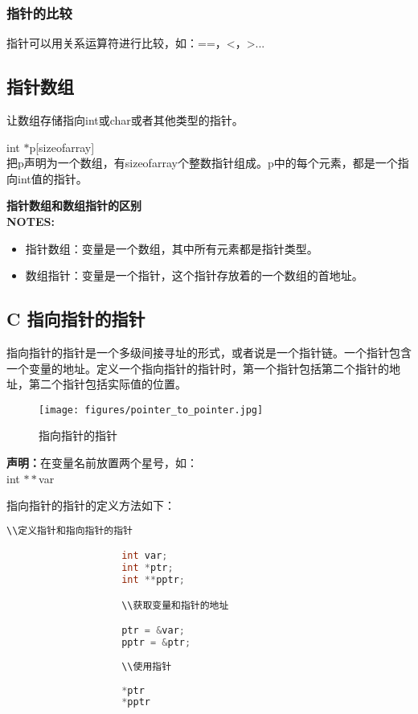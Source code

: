 \documentclass[UTF8]{ctexart}
\begin{document}
			\subsubsection{指针的比较}
			指针可以用关系运算符进行比较，如：==，<，>...
			\subsection{指针数组}
			让数组存储指向int或char或者其他类型的指针。\begin{framed}
				int $*$p[sizeofarray]\\
				把p声明为一个数组，有sizeofarray个整数指针组成。p中的每个元素，都是一个指向int值的指针。
			\end{framed}
			\begin{framed}
				\textbf{指针数组和数组指针的区别}\\ \textbf{NOTES:}
				\begin{itemize}
					\item 指针数组：变量是一个数组，其中所有元素都是指针类型。
					\item 数组指针：变量是一个指针，这个指针存放着的一个数组的首地址。
				\end{itemize}
			\end{framed}
			\subsection{C 指向指针的指针}
			指向指针的指针是一个多级间接寻址的形式，或者说是一个指针链。一个指针包含一个变量的地址。定义一个指向指针的指针时，第一个指针包括第二个指针的地址，第二个指针包括实际值的位置。
			\begin{figure}
				\centering
				\texttt{[image: figures/pointer\_to\_pointer.jpg]}
				\caption{指向指针的指针}
			\end{figure}
			\begin{framed}
				\textbf{声明：}在变量名前放置两个星号，如：\\
				int $**$var
			\end{framed}
			指向指针的指针的定义方法如下：
				\begin{lstlisting}[language=C]
					\\定义指针和指向指针的指针

					int var;
					int *ptr;
					int **pptr;

					\\获取变量和指针的地址

					ptr = &var;
					pptr = &ptr;
					
					\\使用指针
					
					*ptr
					*pptr

				\end{lstlisting}
\end{document}
